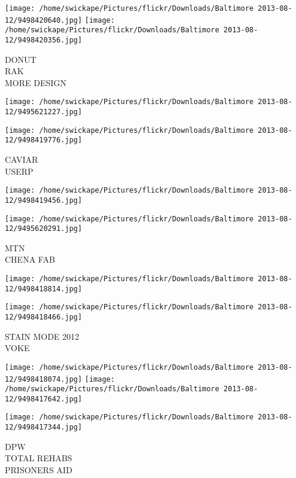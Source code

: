 \documentclass[10pt,letterpaper]{article}
\begin{document}
\vspace{0.25in}
\texttt{[image: /home/swickape/Pictures/flickr/Downloads/Baltimore 2013-08-12/9498420640.jpg]}
\texttt{[image: /home/swickape/Pictures/flickr/Downloads/Baltimore 2013-08-12/9498420356.jpg]}

DONUT\\
RAK\\
MORE DESIGN\\
\pagebreak

\texttt{[image: /home/swickape/Pictures/flickr/Downloads/Baltimore 2013-08-12/9495621227.jpg]}

\vspace{0.25in}
\texttt{[image: /home/swickape/Pictures/flickr/Downloads/Baltimore 2013-08-12/9498419776.jpg]}

CAVIAR\\
USERP\\
\pagebreak

\texttt{[image: /home/swickape/Pictures/flickr/Downloads/Baltimore 2013-08-12/9498419456.jpg]}

\vspace{0.25in}
\texttt{[image: /home/swickape/Pictures/flickr/Downloads/Baltimore 2013-08-12/9495620291.jpg]}

MTN\\
CHENA FAB\\
\pagebreak

\texttt{[image: /home/swickape/Pictures/flickr/Downloads/Baltimore 2013-08-12/9498418814.jpg]}

\vspace{0.25in}
\texttt{[image: /home/swickape/Pictures/flickr/Downloads/Baltimore 2013-08-12/9498418466.jpg]}

STAIN MODE 2012\\
VOKE\\
\pagebreak

\texttt{[image: /home/swickape/Pictures/flickr/Downloads/Baltimore 2013-08-12/9498418074.jpg]}
\texttt{[image: /home/swickape/Pictures/flickr/Downloads/Baltimore 2013-08-12/9498417642.jpg]}

\vspace{0.25in}
\texttt{[image: /home/swickape/Pictures/flickr/Downloads/Baltimore 2013-08-12/9498417344.jpg]}

DPW\\
TOTAL REHABS\\
PRISONERS AID\\
\pagebreak
\end{document}

